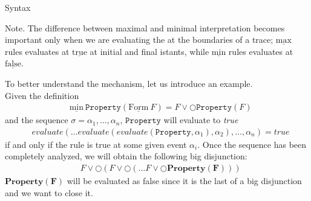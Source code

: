 \documentclass[aspectratio=169,t,xcolor=table]{beamer}
\begin{document}
\begin{frame}[allowframebreaks]{Syntax}
    \begin{block}{Note.}    
        The difference between maximal and minimal interpretation becomes important only when we are evaluating the at the boundaries of a trace; $\underline{\text{max}}$ rules evaluates at $\underline{\text{true}}$ at initial and final istants, while $\underline{\text{min}}$ rules evaluates at $\underline{\text{false}}$.
    \end{block}    
    \newpage
    To better understand the mechanism, let us introduce an example.\\ Given the definition 
    \begin{align*}
        & \underline{\text{min}}\ \mathtt{Property}(\underline{\text{Form}}\ F) =F \lor \bigcirc \mathtt{Property}(F)
    \end{align*} 
    and the sequence $\sigma=\alpha_{1},\ldots ,\alpha_{n}$, $\mathtt{Property}$ will evaluate to \textit{true} 
    \begin{align*}
        & evaluate(\ldots evaluate(evaluate(\mathtt{Property},\alpha_1),\alpha_2),\ldots,\alpha_n)=true
    \end{align*}
    if and only if the rule is true at some given event $\alpha_i$. Once the sequence has been completely analyzed, we will obtain the following big disjunction: 
    \begin{align*}
        & F \lor \bigcirc(F \lor \bigcirc(\ldots F \lor \bigcirc \mathbf{Property(F)})) 
    \end{align*}
    $\mathbf{Property(F)}$ will be evaluated as false since it is the last of a big disjunction and we want to close it.

\end{frame}
\end{document}
